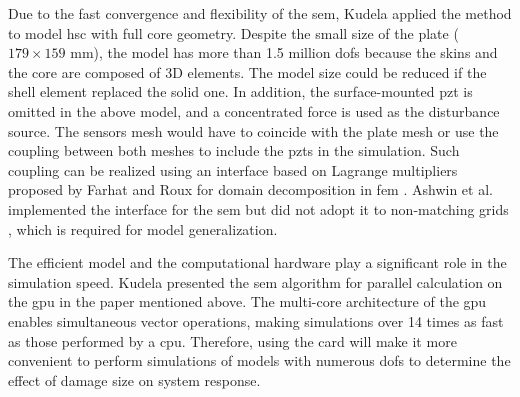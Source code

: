 Due to the fast convergence and flexibility of the \ac{sem}, Kudela applied the method to model \ac{hsc} with full core geometry.
Despite the small size of the plate ($179 \times 159$ mm), the model has more than 1.5 million \acp{dof} because the skins and the core are composed of 3D elements.
The model size could be reduced if the shell element replaced the solid one.
In addition, the surface-mounted \ac{pzt} is omitted in the above model, and a concentrated force is used as the disturbance source.
The sensors mesh would have to coincide with the plate mesh or use the coupling between both meshes to include the \acp{pzt} in the simulation.
Such coupling can be realized using an interface based on Lagrange multipliers proposed by Farhat and Roux for domain decomposition in \ac{fem} \cite{farhat1991method}.
Ashwin et al. implemented the interface for the \ac{sem} but did not adopt it to non-matching grids \cite{ashwin2014formulation}, which is required for model generalization.

The efficient model and the computational hardware play a significant role in the simulation speed. 
Kudela presented the \ac{sem} algorithm for parallel calculation on the \ac{gpu} in the paper mentioned above.
The multi-core architecture of the \ac{gpu} enables simultaneous vector operations, making simulations over 14 times as fast as those performed by a \ac{cpu}.
Therefore, using the card will make it more convenient to perform simulations of models with numerous \acp{dof} to determine the effect of damage size on system response.
